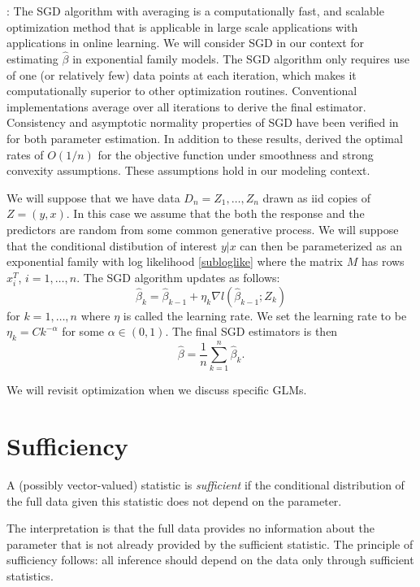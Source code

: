 \documentclass[12pt]{article}
\begin{document}
\vspace*{0.5cm}: The SGD algorithm with averaging \citep{polyak1992acceleration} is a computationally fast, and scalable optimization method that is applicable in large scale applications with applications in online learning. We will consider SGD in our context for estimating $\hat\beta$ in exponential family models. The SGD algorithm only requires use of one (or relatively few) data points at each iteration, which makes it computationally superior to other optimization routines. Conventional implementations average over all iterations to derive the final estimator. Consistency and asymptotic normality properties of SGD have been verified in \cite{polyak1992acceleration} for both parameter estimation. In addition to these results, \cite{rakhlin2011making} derived the optimal rates of $O(1/n)$ for the objective function under smoothness and strong convexity assumptions. These assumptions hold in our modeling context.

We will suppose that we have data $D_n = Z_1,\ldots,Z_n$ drawn as iid copies of $Z = (y,x)$. In this case we assume that the both the response and the predictors are random from some common generative process. We will suppose that the conditional distibution of interest $y|x$ can then be parameterized as an exponential family with log likelihood \eqref{subloglike} where the matrix $M$ has rows $x_i^T$, $i = 1,\ldots,n$. The SGD algorithm updates as follows: 
$$
  \hat{\beta}_{k} = \hat\beta_{k-1} + \eta_{k}\nabla l(\hat\beta_{k-1}; Z_{k})
$$
for $k = 1,\ldots,n$ where $\eta$ is called the learning rate. We set the learning rate to be $\eta_k = Ck^{-\alpha}$ for some $\alpha \in (0, 1)$. The final SGD estimators is then
$$
  \hat\beta = \frac{1}{n}\sum_{k=1}^n \hat{\beta}_{k}.
$$


\noindent We will revisit optimization when we discuss specific GLMs.







\section*{Sufficiency}

A (possibly vector-valued) statistic is \emph{sufficient} if the conditional distribution of the full data given this statistic does not depend on the parameter. 


The interpretation is that the full data provides no information about the parameter that is not already provided by the sufficient statistic. The principle of sufficiency follows: all inference should depend on the data only through sufficient statistics.
\end{document}
